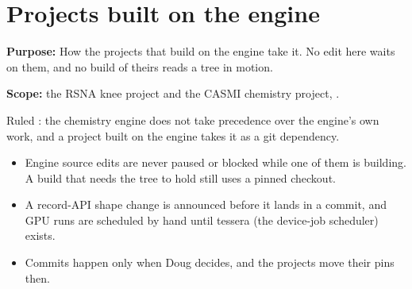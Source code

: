 \chapter{\texorpdfstring{Projects built on the engine}{Projects built on the engine}}
\label{chap:dependent-projects}

\textbf{Purpose:} How the projects that build on the engine take it. No edit here waits on them, and no build of theirs reads a tree in motion.

\textbf{Scope:} the RSNA knee project and the CASMI chemistry project, .

Ruled : the chemistry engine does not take precedence over the engine's own work, and a project built on the engine takes it as a git dependency.

\begin{itemize}
\item Engine source edits are never paused or blocked while one of them is building. A build that needs the tree to hold still uses a pinned checkout.
\item A record-API shape change is announced before it lands in a commit, and GPU runs are scheduled by hand until tessera (the device-job scheduler) exists.
\item Commits happen only when Doug decides, and the projects move their pins then.
\end{itemize}
